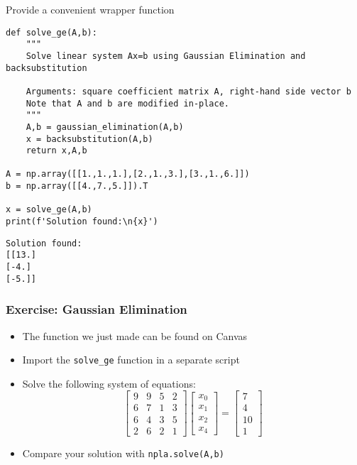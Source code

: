 \begin{frame}[fragile]{Provide a convenient wrapper function}
    \begin{lstlisting}
def solve_ge(A,b):
    """
    Solve linear system Ax=b using Gaussian Elimination and backsubstitution

    Arguments: square coefficient matrix A, right-hand side vector b
    Note that A and b are modified in-place.
    """
    A,b = gaussian_elimination(A,b)
    x = backsubstitution(A,b)
    return x,A,b

A = np.array([[1.,1.,1.],[2.,1.,3.],[3.,1.,6.]])
b = np.array([[4.,7.,5.]]).T

x = solve_ge(A,b)
print(f'Solution found:\n{x}')
    \end{lstlisting}
    \begin{lstlisting}[style=output]
Solution found:
[[13.]
[-4.]
[-5.]]
     \end{lstlisting}  
\end{frame}

\begin{frame}[fragile]
  \frametitle{Exercise: Gaussian Elimination}
  \begin{itemize}
    \item The function we just made can be found on Canvas
    \item Import the \lstinline$solve_ge$ function in a separate script
    \item Solve the following system of equations:
    \[
    \begin{bmatrix}
      9 & 9 & 5 & 2\\ 
      6 & 7 & 1 & 3\\ 
      6 & 4 & 3 & 5\\
      2 & 6 & 2 & 1
    \end{bmatrix}
    \begin{bmatrix}x_0\\x_1\\x_2\\x_4\end{bmatrix} = 
    \begin{bmatrix}7\\4\\10\\1\end{bmatrix}
  \]
  \item Compare your solution with \lstinline$npla.solve(A,b)$
  \end{itemize}
\end{frame}

